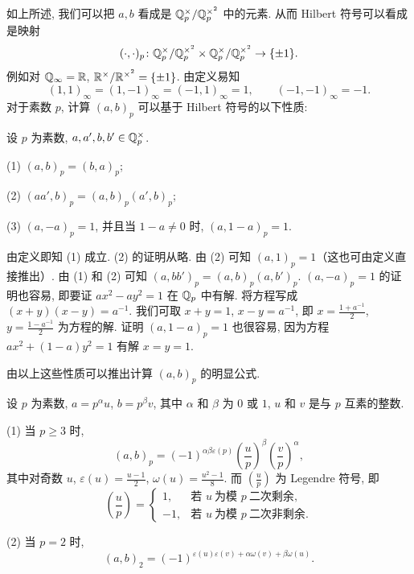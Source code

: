 如上所述, 我们可以把 $a,b$ 看成是 $\mathbb{Q}_p^{\times}/\mathbb{Q}_p^{\times^2}$ 中的元素. 从而 Hilbert 符号可以看成是映射
\[
  (\cdot,\cdot)_p\colon\mathbb{Q}_p^{\times}/\mathbb{Q}_p^{\times^2}\times\mathbb{Q}_p^{\times}/\mathbb{Q}_p^{\times^2}\to\{\pm 1\}.
\]
例如对 $\mathbb{Q}_{\infty}=\mathbb{R}$, $\mathbb{R}^{\times}/\mathbb{R}^{\times^2}=\{\pm 1\}$. 由定义易知
\[
  (1,1)_{\infty}=(1,-1)_{\infty}=(-1,1)_{\infty}=1,\qquad(-1,-1)_{\infty}=-1.
\]
对于素数 $p$, 计算 $(a,b)_p$ 可以基于 Hilbert 符号的以下性质:

\begin{theorem}\label{thm:9.10}
设 $p$ 为素数, $a,a',b,b'\in\mathbb{Q}_p^{\times}$.

(1) $(a,b)_p=(b,a)_p$;

(2) $(aa',b)_p=(a,b)_p(a',b)_p$;

(3) $(a,-a)_p=1$, 并且当 $1-a\neq 0$ 时, $(a,1-a)_p=1$.
\end{theorem}

\begin{remark}
由定义即知 (1) 成立. (2) 的证明从略. 由 (2) 可知 $(a,1)_p=1$（这也可由定义直接推出）. 由 (1) 和 (2) 可知 $(a,bb')_p=(a,b)_p(a,b')_p$. $(a,-a)_p=1$ 的证明也容易, 即要证 $ax^2-ay^2=1$ 在 $\mathbb{Q}_p$ 中有解. 将方程写成 $(x+y)(x-y)=a^{-1}$. 我们可取 $x+y=1$, $x-y=a^{-1}$, 即 $x=\frac{1+a^{-1}}{2}$, $y=\frac{1-a^{-1}}{2}$ 为方程的解. 证明 $(a,1-a)_p=1$ 也很容易, 因为方程 $ax^2+(1-a)y^2=1$ 有解 $x=y=1$.
\end{remark}

由以上这些性质可以推出计算 $(a,b)_p$ 的明显公式.

\begin{theorem}\label{thm:9.11}
设 $p$ 为素数, $a=p^{\alpha}u$, $b=p^{\beta}v$, 其中 $\alpha$ 和 $\beta$ 为 $0$ 或 $1$, $u$ 和 $v$ 是与 $p$ 互素的整数.

(1) 当 $p\geqslant 3$ 时,
\[
  (a,b)_p=(-1)^{\alpha\beta\varepsilon(p)}
  \left(\frac{u}{p}\right)^{\beta}\left(\frac{v}{p}\right)^{\alpha},
\]
其中对奇数 $u$, $\varepsilon(u)=\frac{u-1}{2}$, $\omega(u)=\frac{u^2-1}{8}$. 而 $\left(\frac{u}{p}\right)$ 为 Legendre 符号, 即
\[
  \left(\frac{u}{p}\right)=\begin{cases}
    1, & \text{若 } u\ \text{为模 } p\ \text{二次剩余},\\
    -1, & \text{若 } u\ \text{为模 } p\ \text{二次非剩余}.
  \end{cases}
\]

(2) 当 $p=2$ 时,
\[
  (a,b)_2=(-1)^{\varepsilon(u)\varepsilon(v)+\alpha\omega(v)+\beta\omega(u)}.
\]
\end{theorem}

